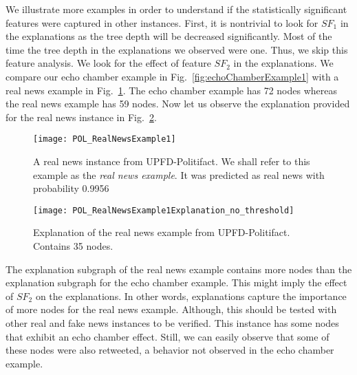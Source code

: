 We illustrate more examples in order to understand if the statistically significant features were captured in other instances. First, it is nontrivial to look for $SF_1$ in the explanations as the tree depth will be decreased significantly. Most of the time the tree depth in the explanations we observed were one. Thus, we skip this feature analysis. We look for the effect of feature $SF_2$ in the explanations. We compare our echo chamber example in Fig.~\ref{fig:echoChamberExample1} with a real news example in Fig.~\ref{fig:POL_RealNewsExample1}. The echo chamber example has 72 nodes whereas the real news example has 59 nodes. Now let us observe the explanation provided for the real news instance in Fig.~\ref{fig:POL_RealNewsExample1Explanation_no_threshold}.\\
\begin{figure}
    \centering
    \texttt{[image: POL\_RealNewsExample1]}
    \caption[A real news instance from UPFD-Politifact]{A real news instance from UPFD-Politifact. We shall refer to this example as the \emph{real news example}. It was predicted as real news with probability 0.9956}
    \label{fig:POL_RealNewsExample1}
\end{figure}
\begin{figure}
    \centering
    \texttt{[image: POL\_RealNewsExample1Explanation\_no\_threshold]}
    \caption[Explanation of the real news example from UPFD-Politifact]{Explanation of the real news example from UPFD-Politifact. Contains 35 nodes.}
    \label{fig:POL_RealNewsExample1Explanation_no_threshold}
\end{figure}
The explanation subgraph of the real news example contains more nodes than the explanation subgraph for the echo chamber example. This might imply the effect of $SF_2$ on the explanations. In other words, explanations capture the importance of more nodes for the real news example. Although, this should be tested with other real and fake news instances to be verified. This instance has some nodes that exhibit an echo chamber effect. Still, we can easily observe that some of these nodes were also retweeted, a behavior not observed in the echo chamber example.\\
